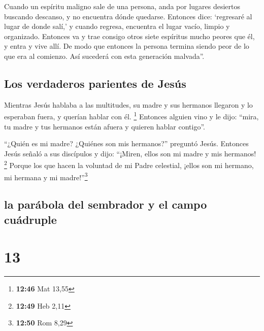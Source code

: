  Cuando un espíritu maligno sale de una persona, anda por
lugares desiertos buscando descanso, y no encuentra dónde quedarse.
 Entonces dice: `regresaré al lugar de donde salí,' y
cuando regresa, encuentra el lugar vacío, limpio y organizado.
 Entonces va y trae consigo otros siete espíritus mucho
peores que él, y entra y vive allí. De modo que entonces la persona
termina siendo peor de lo que era al comienzo. Así sucederá con esta
generación malvada''.

\hypertarget{los-verdaderos-parientes-de-jesuxfas}{%
\subsection{Los verdaderos parientes de
Jesús}\label{los-verdaderos-parientes-de-jesuxfas}}

 Mientras Jesús hablaba a las multitudes, su madre y sus
hermanos llegaron y lo esperaban fuera, y querían hablar con él.
\footnote{\textbf{12:46} Mat 13,55}  Entonces alguien
vino y le dijo: ``mira, tu madre y tus hermanos están afuera y quieren
hablar contigo''.

 ``¿Quién es mi madre? ¿Quiénes son mis hermanos?''
preguntó Jesús.  Entonces Jesús señaló a sus discípulos y
dijo: ``¡Miren, ellos son mi madre y mis hermanos! \footnote{\textbf{12:49}
  Heb 2,11}  Porque los que hacen la voluntad de mi Padre
celestial, ¡ellos son mi hermano, mi hermana y mi madre!''\footnote{\textbf{12:50}
  Rom 8,29}

\hypertarget{la-paruxe1bola-del-sembrador-y-el-campo-cuuxe1druple}{%
\subsection{la parábola del sembrador y el campo
cuádruple}\label{la-paruxe1bola-del-sembrador-y-el-campo-cuuxe1druple}}

\hypertarget{section-12}{%
\section{13}\label{section-12}}

